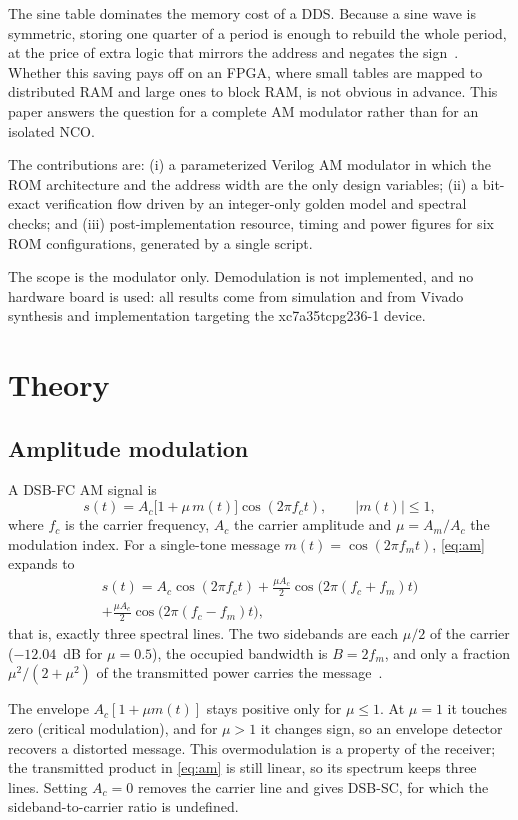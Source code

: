 \documentclass[conference]{IEEEtran}
\begin{document}
The sine table dominates the memory cost of a DDS. Because a sine wave is
symmetric, storing one quarter of a period is enough to rebuild the whole
period, at the price of extra logic that mirrors the address and negates the
sign~\cite{nicholas1987,vankka2005}. Whether this saving pays off on an FPGA,
where small tables are mapped to distributed RAM and large ones to block RAM,
is not obvious in advance. This paper answers the question for a complete AM
modulator rather than for an isolated NCO.

The contributions are: (i) a parameterized Verilog AM modulator in which the
ROM architecture and the address width are the only design variables;
(ii) a bit-exact verification flow driven by an integer-only golden model and
spectral checks; and (iii) post-implementation resource, timing and power
figures for six ROM configurations, generated by a single script.

The scope is the modulator only. Demodulation is not implemented, and no
hardware board is used: all results come from simulation and from Vivado
synthesis and implementation targeting the xc7a35tcpg236-1 device.

\section{Theory}
\subsection{Amplitude modulation}
A DSB-FC AM signal is
\begin{equation}
s(t)=A_c\bigl[1+\mu\,m(t)\bigr]\cos(2\pi f_c t),\qquad |m(t)|\le 1,
\label{eq:am}
\end{equation}
where $f_c$ is the carrier frequency, $A_c$ the carrier amplitude and
$\mu=A_m/A_c$ the modulation index. For a single-tone message
$m(t)=\cos(2\pi f_m t)$, \eqref{eq:am} expands to
\begin{multline}
s(t)=A_c\cos(2\pi f_c t)+\tfrac{\mu A_c}{2}\cos\bigl(2\pi(f_c+f_m)t\bigr)\\
+\tfrac{\mu A_c}{2}\cos\bigl(2\pi(f_c-f_m)t\bigr),
\label{eq:lines}
\end{multline}
that is, exactly three spectral lines. The two sidebands are each $\mu/2$ of the
carrier ($-12.04$~dB for $\mu=0.5$), the occupied bandwidth is $B=2f_m$, and only a
fraction $\mu^2/(2+\mu^2)$ of the transmitted power carries the message~\cite{haykin2001}.

The envelope $A_c[1+\mu m(t)]$ stays positive only for $\mu\le1$. At $\mu=1$ it
touches zero (critical modulation), and for $\mu>1$ it changes sign, so an
envelope detector recovers a distorted message. This overmodulation is a
property of the receiver; the transmitted product in \eqref{eq:am} is still
linear, so its spectrum keeps three lines. Setting $A_c=0$ removes the carrier
line and gives DSB-SC, for which the sideband-to-carrier ratio is undefined.
\end{document}
